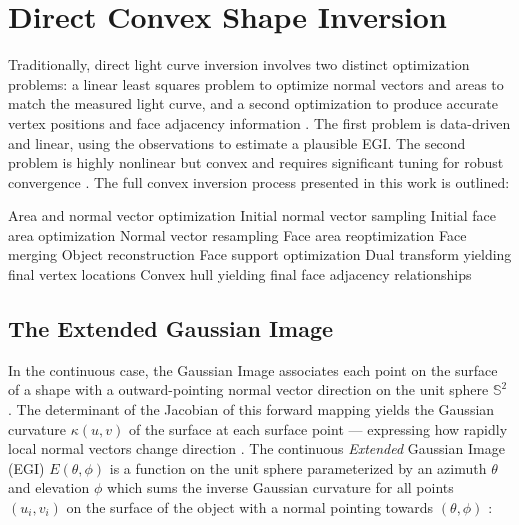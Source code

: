 
\graphicspath{{/Users/liamrobinson/Documents/msthesis/static_images/aas_2022_figs}}

\section{Direct Convex Shape Inversion}

Traditionally, direct light curve inversion involves two distinct optimization problems: a linear least squares problem to optimize normal vectors and areas to match the measured light curve, and a second optimization to produce accurate vertex positions and face adjacency information \cite{fan2020thesis, kaasalainen2000, kaas2001shape, cabrera2021}. The first problem is data-driven and linear, using the observations to estimate a plausible EGI. The second problem is highly nonlinear but convex and requires significant tuning for robust convergence \cite{fan2019}. The full convex inversion process presented in this work is outlined:

\begin{outline}[enumerate]
  \1 Area and normal vector optimization
    \2 Initial normal vector sampling
    \2 Initial face area optimization
    \2 Normal vector resampling
    \2 Face area reoptimization
    \2 Face merging
  \1 Object reconstruction
    \2 Face support optimization
    \2 Dual transform yielding final vertex locations
    \2 Convex hull yielding final face adjacency relationships
\end{outline}

\subsection{The Extended Gaussian Image} \label{sec:egi_definition}

In the continuous case, the Gaussian Image associates each point on the surface of a shape with a outward-pointing normal vector direction on the unit sphere $\mathbb{S}^2$ \cite{horn1984}. The determinant of the Jacobian of this forward mapping yields the Gaussian curvature $\kappa(u,v)$ of the surface at each surface point --- expressing how rapidly local normal vectors change direction \cite{horn1984}. The continuous \textit{Extended} Gaussian Image (EGI) $E(\theta, \phi)$ is a function on the unit sphere parameterized by an azimuth $\theta$ and elevation $\phi$ which sums the inverse Gaussian curvature for all points $(u_i, v_i)$ on the surface of the object with a normal pointing towards $(\theta, \phi)$ \cite{horn1984}:

